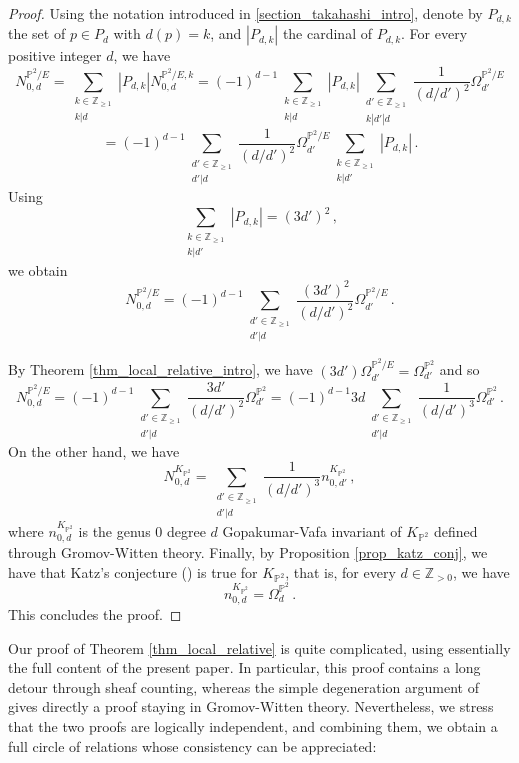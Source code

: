 \documentclass[11pt,letterpaper]{amsart}
\newcommand\PP{\mathbb P}
\newcommand\Z{\mathbb Z}
\begin{document}
\begin{proof}
Using the notation introduced in 
\cref{section_takahashi_intro}, denote by 
$P_{d,k}$ the set of $p \in P_d$ 
with $d(p)=k$, and $|P_{d,k}|$
the cardinal of $P_{d,k}$.
For every positive integer $d$, we have 
\[ N_{0,d}^{\PP^2/E}
=\sum_{\substack{k \in \Z_{\geqslant 1}\\
k|d}} |P_{d,k}|N_{0,d}^{\PP^2/E,k}
=(-1)^{d-1}\sum_{\substack{k \in \Z_{\geqslant 1}\\
k|d}} |P_{d,k}|
\sum_{\substack{d'\in \Z_{\geqslant 1}\\
k|d'|d}} \frac{1}{(d/d')^2}\Omega_{d'}^{\PP^2/E}\]
\[=(-1)^{d-1} \sum_{\substack{d'\in \Z_{\geqslant 1}\\
d'|d}} \frac{1}{(d/d')^2}\Omega_{d'}^{\PP^2/E}\sum_{\substack{k \in \Z_{\geqslant 1}\\
k|d'}} |P_{d,k}|\,.\]
Using \[\sum_{\substack{k \in \Z_{\geqslant 1}\\
k|d'}} |P_{d,k}|=(3d')^2\,,\]
we obtain 
\[ N_{0,d}^{\PP^2/E}=(-1)^{d-1} \sum_{\substack{d'\in \Z_{\geqslant 1}\\
d'|d}} \frac{(3d')^2}{(d/d')^2}\Omega_{d'}^{\PP^2/E}\,.\]
 
By Theorem 
\ref{thm_local_relative_intro},
we have $(3d')\Omega_{d'}^{\PP^2/E}
=\Omega_{d'}^{\PP^2}$ and so
\[ N_{0,d}^{\PP^2/E}=(-1)^{d-1} \sum_{\substack{d'\in \Z_{\geqslant 1}\\
d'|d}} \frac{3d'}{(d/d')^2}\Omega_{d'}^{\PP^2}=(-1)^{d-1}3d\sum_{\substack{d'\in \Z_{\geqslant 1}\\
d'|d}} \frac{1}{(d/d')^3}\Omega_{d'}^{\PP^2} \,.\]
On the other hand, we have 
\[ N_{0,d}^{K_{\PP^2}}=\sum_{\substack{d'\in \Z_{\geqslant 1}\\
d'|d}} \frac{1}{(d/d')^3} n_{0,d'}^{K_{\PP^2}}\,,\]
where  $n_{0,d}^{K_{\PP^2}}$ is the genus $0$ degree $d$ Gopakumar-Vafa invariant of 
$K_{\PP^2}$ defined through Gromov-Witten theory. Finally, by Proposition
\ref{prop_katz_conj}, we have that Katz's conjecture
(\cite[Conjecture 2.3]{MR2420017}) is true for $K_{\PP^2}$, that is, for every $d \in \Z_{>0}$, we have
\[ n_{0,d}^{K_{\PP^2}}=\Omega_{d}^{\PP^2}\,.\]
This concludes the proof.
\end{proof}

 Our proof of Theorem \ref{thm_local_relative} is quite complicated, using essentially the full content of the present paper. 
 In particular, this proof contains a long detour through sheaf counting, whereas the simple degeneration argument of \cite{MR3948687} gives directly a proof staying in Gromov-Witten theory. 
 Nevertheless, we stress that the two proofs are logically independent, and combining them, we obtain a full circle of relations whose consistency can be appreciated:
\end{document}
